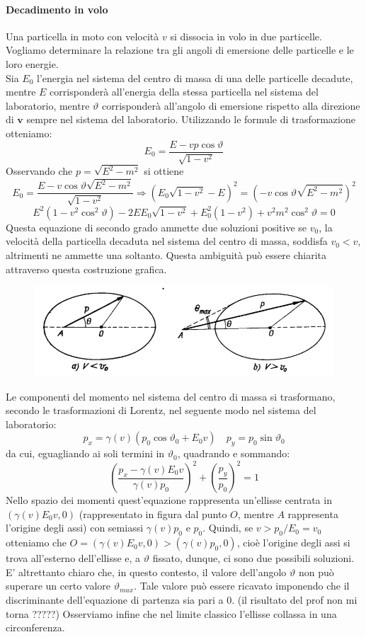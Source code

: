 \documentclass[a4paper,11pt]{book}
\theoremstyle{plain}
\theoremstyle{definition}
\begin{document}
\paragraph{Decadimento in volo} Una particella in moto con velocità $v$ si dissocia in volo in due particelle. Vogliamo determinare la relazione tra gli angoli di emersione delle particelle e le loro energie. \\
Sia $E_0$ l'energia nel sistema del centro di massa di una delle particelle decadute, mentre $E$ corrisponderà all'energia della stessa particella nel sistema del laboratorio, mentre $\vartheta$ corrisponderà all'angolo di emersione rispetto alla direzione di $\textbf{v}$ sempre nel sistema del laboratorio. Utilizzando le formule di trasformazione otteniamo:
\[
E_0=\frac{E-vp\cos\vartheta}{\sqrt{1-v^2}}
\]
Osservando che $p=\sqrt{E^2-m^2}$ si ottiene
\[
E_0 = \frac{E-v\cos\vartheta\sqrt{E^2-m^2}}{\sqrt{1-v^2}} \Rightarrow (E_0\sqrt{1-v^2}-E)^2=(-v\cos\vartheta\sqrt{E^2-m^2})^2
\]
\[
E^2(1-v^2\cos^2\vartheta)-2EE_0\sqrt{1-v^2}+E_0^2(1-v^2)+v^2m^2\cos^2\vartheta=0
\]
Questa equazione di secondo grado ammette due soluzioni positive se $v_0$, la velocità della particella decaduta nel sistema del centro di massa, soddisfa $v_0<v$, altrimenti ne ammette una soltanto. Questa ambiguità può essere chiarita attraverso questa costruzione grafica. 
\begin{figure}[!h]
\centering
\includegraphics[scale=0.45]{ellisse}
\end{figure}
Le componenti del momento nel sistema del centro di massa si trasformano, secondo le trasformazioni di Lorentz, nel seguente modo nel sistema del laboratorio:
\[
p_x = \gamma(v)(p_0\cos\vartheta_0+E_0v) \quad p_y = p_0\sin\vartheta_0
\]
da cui, eguagliando ai soli termini in $\vartheta_0$, quadrando e sommando:
\[
\left( \frac{p_x-\gamma(v)E_0v}{\gamma(v)p_0} \right)^2+\left( \frac{p_y}{p_0} \right)^2=1
\]
Nello spazio dei momenti quest'equazione rappresenta un'ellisse centrata in $(\gamma(v)E_0v,0)$ (rappresentato in figura dal punto $O$, mentre $A$ rappresenta l'origine degli assi) con semiassi $\gamma(v)p_0$ e $p_0$. Quindi, se $v>p_0/E_0=v_0$ otteniamo che $O=(\gamma(v)E_0v,0)>(\gamma(v)p_0,0)$, cioè l'origine degli assi si trova all'esterno dell'ellisse e, a $\vartheta$ fissato, dunque, ci sono due possibili soluzioni. E' altrettanto chiaro che, in questo contesto, il valore dell'angolo $\vartheta$ non può superare un certo valore $\vartheta_{max}$. Tale valore può essere ricavato imponendo che il discriminante dell'equazione di partenza sia pari a 0. (il risultato del prof non mi torna ?????) Osserviamo infine che nel limite classico l'ellisse collassa in una circonferenza. 
\end{document}
